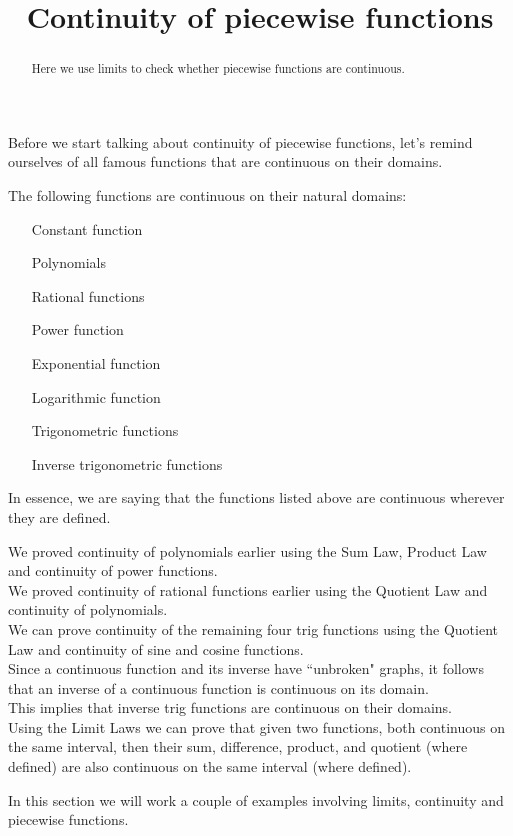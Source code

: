 \documentclass{ximera}
\title[Dig-In:]{Continuity of piecewise functions}
\begin{document}
\begin{abstract}
Here we use limits to check whether piecewise functions are continuous.
\end{abstract}
\maketitle
Before we start talking about continuity of piecewise functions, let's remind ourselves of all famous functions that are continuous on their domains.
\begin{theorem}\label{theorem:continuity}
The following functions are continuous on their natural domains:
\begin{itemize}
\item[Constant function]
\item[Polynomials]
\item[Rational functions]
\item[Power function]
\item[Exponential function] 
\item[Logarithmic function] 
\item[Trigonometric functions]  
\item[Inverse trigonometric functions]     
\end{itemize}
In essence, we are saying that the functions listed above are
continuous wherever they are defined.

We  proved continuity of polynomials earlier using the Sum Law, Product Law and continuity of power functions.\\
We  proved continuity of rational functions earlier using the Quotient Law and  continuity of polynomials.\\
We can  prove continuity of the remaining four trig functions using the Quotient Law and continuity of sine and cosine functions.\\

Since a continuous function and its inverse have ``unbroken" graphs, it follows that an inverse of a continuous function is continuous on its domain.\\
This implies that inverse trig functions are continuous on their domains. \\


Using the Limit Laws we can prove that given two functions, both continuous on the same  interval, then their sum, difference, product, and quotient (where defined) are also continuous on the same interval (where defined). 




\end{theorem}
In this section we will work a couple of examples involving limits,
continuity and piecewise functions.
\end{document}
